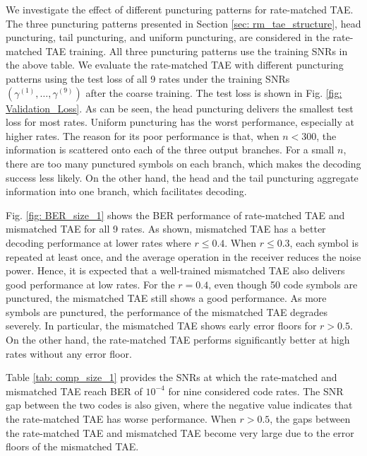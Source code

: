 \documentclass [PhD] {uclathes}
\begin{document}
We investigate the effect of different puncturing patterns for rate-matched TAE. The three puncturing patterns presented in Section \ref{sec: rm_tae_structure}, head puncturing, tail puncturing, and uniform puncturing, are considered in the rate-matched TAE training. All three puncturing patterns use the training SNRs in the above table.
We evaluate the rate-matched TAE with different puncturing patterns using the test loss of all 9 rates under the training SNRs $(\gamma^{(1)},\ldots,\gamma^{(9)})$ after the coarse training. The test loss is shown in Fig. \ref{fig: Validation_Loss}. As can be seen, the head puncturing delivers the smallest test loss for most rates. Uniform puncturing has the worst performance, especially at higher rates. The reason for its poor performance is that, when $n<300$, the information is scattered onto each of the three output branches. For a small $n$, there are too many punctured symbols on each branch, which makes the decoding success less likely. On the other hand, the head and the tail puncturing aggregate information into one branch, which facilitates decoding.

Fig. \ref{fig: BER_size_1} shows the BER performance of rate-matched TAE and mismatched TAE for all 9 rates. As shown, mismatched TAE has a better decoding performance at lower rates where $r\leq 0.4$. When $r\leq 0.3$, each symbol is repeated at least once, and the average operation in the receiver reduces the noise power. Hence, it is expected that a well-trained mismatched TAE also delivers good performance at low rates. For the $r=0.4$, even though 50 code symbols are punctured, the mismatched TAE still shows a good performance.
As more symbols are punctured, the performance of the mismatched TAE degrades severely. In particular, the mismatched TAE shows early error floors for $r>0.5$. On the other hand, the rate-matched TAE performs significantly better at high rates without any error floor.

Table \ref{tab: comp_size_1} provides the SNRs at which the rate-matched and mismatched TAE reach BER of $10^{-4}$ for nine considered code rates. The SNR gap between the two codes is also given, where the negative value indicates that the rate-matched TAE has worse performance. When $r>0.5$, the gaps between the rate-matched TAE and mismatched TAE become very large due to the error floors of  the mismatched TAE. 
\end{document}
